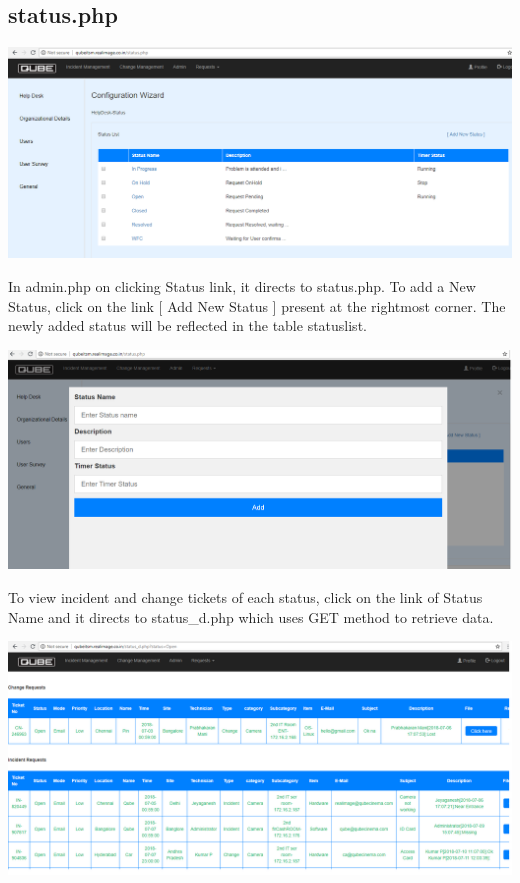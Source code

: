 \documentclass{article}
\begin{document}
\subsection{status.php}
\begin{center}

    \includegraphics[width=7.0in]{status.png}
   
    \label{}

\end{center}
In admin.php on clicking Status link, it directs to status.php. To add a New Status, click on the link [ Add New Status ] present at the rightmost corner. The newly added status will be reflected in the table statuslist.
\begin{center}

    \includegraphics[width=7.0in]{status2.png}
   
    \label{}

\end{center}

To view incident and change tickets of each status, click on the link of Status Name and it directs to status\_d.php which uses GET method to retrieve data.
\begin{center}

    \includegraphics[width=7.0in]{status1.png}
   
    \label{}

\end{center}
\end{document}
